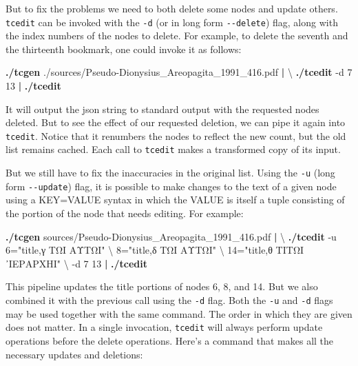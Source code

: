 \documentclass[
  letterpaper,
]{tufte-handout}
\newenvironment{Shaded}{\begin{snugshade}}{\end{snugshade}}
\newcommand{\AttributeTok}[1]{\textcolor[rgb]{0.00,0.34,0.68}{#1}}
\newcommand{\DataTypeTok}[1]{\textcolor[rgb]{0.00,0.34,0.68}{#1}}
\newcommand{\ExtensionTok}[1]{\textcolor[rgb]{0.00,0.58,1.00}{\textbf{#1}}}
\newcommand{\KeywordTok}[1]{\textcolor[rgb]{0.12,0.11,0.11}{\textbf{#1}}}
\newcommand{\NormalTok}[1]{\textcolor[rgb]{0.12,0.11,0.11}{#1}}
\newcommand{\StringTok}[1]{\textcolor[rgb]{0.75,0.01,0.01}{#1}}
\begin{document}
But to fix the problems we need to both delete some nodes and update
others. \texttt{tcedit} can be invoked with the \texttt{-d} (or in long
form \texttt{-\/-delete}) flag, along with the index numbers of the
nodes to delete. For example, to delete the seventh and the thirteenth
bookmark, one could invoke it as follows:

\begin{Shaded}
\begin{Highlighting}[]
\ExtensionTok{./tcgen}\NormalTok{ ./sources/Pseudo{-}Dionysius\_Areopagita\_1991\_416.pdf }\KeywordTok{|} \DataTypeTok{\textbackslash{}}
\ExtensionTok{./tcedit} \AttributeTok{{-}d}\NormalTok{ 7 13 }\KeywordTok{|} \ExtensionTok{./tcedit}
\end{Highlighting}
\end{Shaded}

It will output the json string to standard output with the requested
nodes deleted. But to see the effect of our requested deletion, we can
pipe it again into \texttt{tcedit}. Notice that it renumbers the nodes
to reflect the new count, but the old list remains cached. Each call to
\texttt{tcedit} makes a transformed copy of its input.

But we still have to fix the inaccuracies in the original list. Using
the \texttt{-u} (long form \texttt{-\/-update}) flag, it is possible to
make changes to the text of a given node using a KEY=VALUE syntax in
which the VALUE is itself a tuple consisting of the portion of the node
that needs editing. For example:

\begin{Shaded}
\begin{Highlighting}[]
\ExtensionTok{./tcgen}\NormalTok{ sources/Pseudo{-}Dionysius\_Areopagita\_1991\_416.pdf }\KeywordTok{|} \DataTypeTok{\textbackslash{}}
\ExtensionTok{./tcedit} \AttributeTok{{-}u}\NormalTok{ 6=}\StringTok{"title,γ ΤΩΙ ΑΥΤΩΙ"} \DataTypeTok{\textbackslash{}}
\NormalTok{8=}\StringTok{"title,δ ΤΩΙ ΑΥΤΩΙ"} \DataTypeTok{\textbackslash{}}
\NormalTok{14=}\StringTok{"title,θ ΤΙΤΩΙ ᾽ΙΕΡΑΡΧΗΙ"} \DataTypeTok{\textbackslash{}}
\NormalTok{{-}d 7 13 }\KeywordTok{|} \ExtensionTok{./tcedit}
\end{Highlighting}
\end{Shaded}

This pipeline updates the title portions of nodes 6, 8, and 14. But we
also combined it with the previous call using the \texttt{-d} flag. Both
the \texttt{-u} and \texttt{-d} flags may be used together with the same
command. The order in which they are given does not matter. In a single
invocation, \texttt{tcedit} will always perform update operations before
the delete operations. Here's a command that makes all the necessary
updates and deletions:
\end{document}
